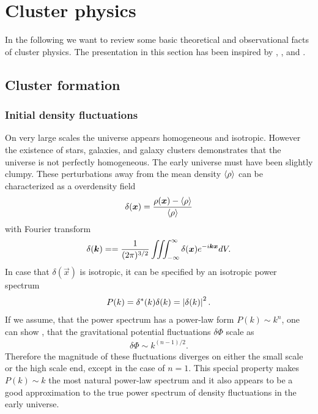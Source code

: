\chapter{Cluster physics}\label{clustertheo}
In the following we want to review some basic theoretical and observational
facts of cluster physics. The presentation in this section has been inspired by
\citet{Pfrommer2005}, \citet{Sarazin1988}, \citet{Voit2005} and
\citet{Plionis2008}.

\section{Cluster formation}
\subsection{Initial density fluctuations}
On very large scales the universe appears homogeneous and isotropic. However
the existence of stars, galaxies, and galaxy clusters demonstrates that the
universe is not perfectly homogeneous. The early universe must have been
slightly clumpy. These perturbations away from the mean density $\langle \rho \rangle$ can
be characterized as a overdensity field 
\begin{align}
\delta(\boldsymbol{x}) = \frac{\rho(\boldsymbol{x})-\langle \rho \rangle}{\langle \rho \rangle}
\end{align}
with Fourier transform
\begin{align}
\delta(\boldsymbol{k}) = =\frac{1}{(2\pi)^{3/2}}\iiint^{\infty}_{-\infty} \delta(\boldsymbol{x}) e^{-i\boldsymbol{k}\boldsymbol{x}} dV.
\end{align}
In case that $\delta(\vec{x})$ is isotropic, it can be specified by an
isotropic power spectrum
\begin{align}
P(k) = \delta^*(k)\delta(k)= \left\lvert\delta(k)\right\rvert^2.
\end{align}
If we assume, that the power spectrum has a power-law form $P(k) \sim k^n$, one
can show \citep{Peebles1970}, that the gravitational potential fluctuations 
$\delta\Phi$ scale as
\begin{align}
\delta\Phi \sim k^{(n-1)/2}.
\end{align}
Therefore the magnitude of these fluctuations diverges on either the
small scale or the high scale end, except in the case of $n=1$. This special
property makes $P(k) \sim k$ the most natural power-law spectrum and it also
appears to be a good approximation to the true power spectrum of density
fluctuations in the early universe. 

